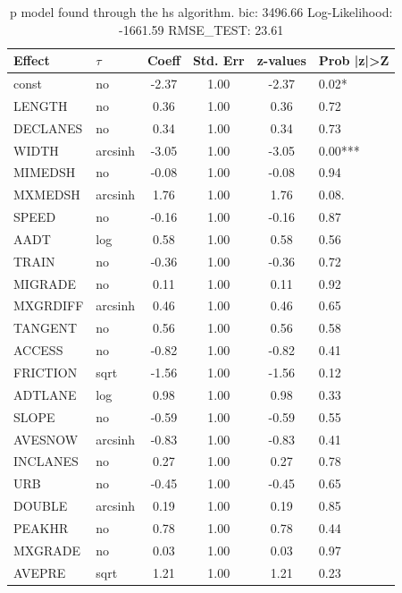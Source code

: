\begin{table}
	\caption{p model found through the hs algorithm. bic: 3496.66 Log-Likelihood: -1661.59 RMSE_TEST: 23.61}
	\begin{center}
		\begin{tabular}{|l|l|c|c|c|l|}
			\hline
			Effect & $\tau$ & Coeff & Std. Err & z-values & Prob |z|>Z \\
			\hline
			const & no & -2.37 & 1.00 & -2.37 & 0.02* \\
			\hline
			LENGTH & no & 0.36 & 1.00 & 0.36 & 0.72 \\
			\hline
			DECLANES & no & 0.34 & 1.00 & 0.34 & 0.73 \\
			\hline
			WIDTH & arcsinh & -3.05 & 1.00 & -3.05 & 0.00*** \\
			\hline
			MIMEDSH & no & -0.08 & 1.00 & -0.08 & 0.94 \\
			\hline
			MXMEDSH & arcsinh & 1.76 & 1.00 & 1.76 & 0.08. \\
			\hline
			SPEED & no & -0.16 & 1.00 & -0.16 & 0.87 \\
			\hline
			AADT & log & 0.58 & 1.00 & 0.58 & 0.56 \\
			\hline
			TRAIN & no & -0.36 & 1.00 & -0.36 & 0.72 \\
			\hline
			MIGRADE & no & 0.11 & 1.00 & 0.11 & 0.92 \\
			\hline
			MXGRDIFF & arcsinh & 0.46 & 1.00 & 0.46 & 0.65 \\
			\hline
			TANGENT & no & 0.56 & 1.00 & 0.56 & 0.58 \\
			\hline
			ACCESS & no & -0.82 & 1.00 & -0.82 & 0.41 \\
			\hline
			FRICTION & sqrt & -1.56 & 1.00 & -1.56 & 0.12 \\
			\hline
			ADTLANE & log & 0.98 & 1.00 & 0.98 & 0.33 \\
			\hline
			SLOPE & no & -0.59 & 1.00 & -0.59 & 0.55 \\
			\hline
			AVESNOW & arcsinh & -0.83 & 1.00 & -0.83 & 0.41 \\
			\hline
			INCLANES & no & 0.27 & 1.00 & 0.27 & 0.78 \\
			\hline
			URB & no & -0.45 & 1.00 & -0.45 & 0.65 \\
			\hline
			DOUBLE & arcsinh & 0.19 & 1.00 & 0.19 & 0.85 \\
			\hline
			PEAKHR & no & 0.78 & 1.00 & 0.78 & 0.44 \\
			\hline
			MXGRADE & no & 0.03 & 1.00 & 0.03 & 0.97 \\
			\hline
			AVEPRE & sqrt & 1.21 & 1.00 & 1.21 & 0.23 \\

\end{tabular}
\end{center}
\end{table}
